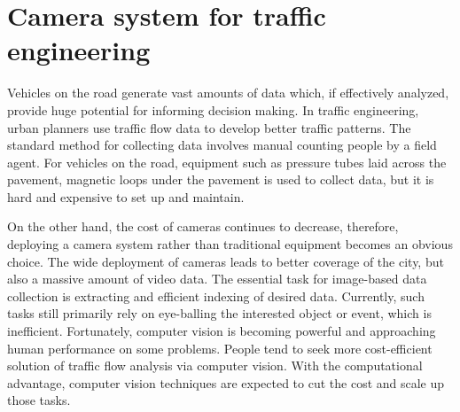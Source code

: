 \section{Camera system for traffic engineering}
\label{sec:intro-its}

Vehicles on the road generate vast amounts of data which, if effectively analyzed, provide huge potential for informing decision making.
In traffic engineering, urban planners use traffic flow data to develop better traffic patterns.
The standard method for collecting data involves manual counting people by a field agent.
For vehicles on the road, equipment such as pressure tubes laid across the pavement, magnetic loops under the pavement \cite{klein2006traffic,mimbela2000summary} is used to collect data, but it is hard and expensive to set up and maintain.

On the other hand, the cost of cameras continues to decrease, therefore, deploying a camera system rather than traditional equipment becomes an obvious choice.
The wide deployment of cameras leads to better coverage of the city, but also a massive amount of video data.
The essential task for image-based data collection is extracting and efficient indexing of desired data.
Currently, such tasks still primarily rely on eye-balling the interested object or event, which is inefficient.
Fortunately, computer vision is becoming powerful and approaching human performance on some problems.
People tend to seek more cost-efficient solution of traffic flow analysis via computer vision.
With the computational advantage, computer vision techniques are expected to cut the cost and scale up those tasks.